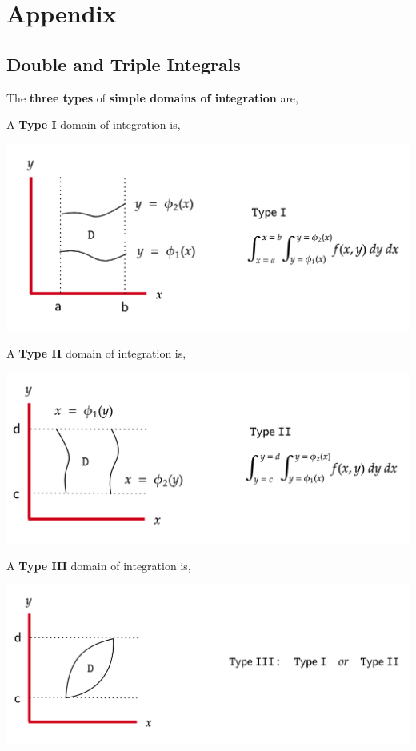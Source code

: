 \section{Appendix}
\subsection{Double and Triple Integrals}
The \textbf{three types} of \textbf{simple domains of integration} are,

\begin{defn}[Type I]
	A \textbf{Type I} domain of integration is,
	\begin{center}
    \includegraphics[width=0.7\linewidth]{figures/wk-6/type-1.png}
    \end{center}
\end{defn}

\begin{defn}[Type II]
	A \textbf{Type II} domain of integration is,
	\begin{center}
    \includegraphics[width=0.7\linewidth]{figures/wk-6/type-2.png}
    \end{center}
\end{defn}
	
\begin{defn}
	A \textbf{Type III} domain of integration is,
	\begin{center}
    \includegraphics[width=0.7\linewidth]{figures/wk-6/type-3.png}
    \end{center}
\end{defn}

